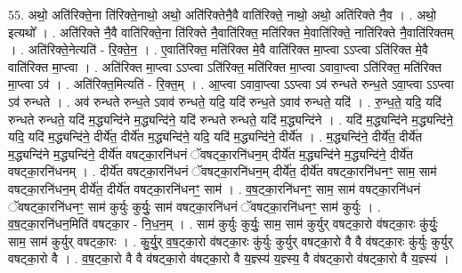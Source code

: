 \documentclass[17pt]{extarticle}
\begin{document}
55. अथो॒ अति॑रिक्ते॒ना ति॑रिक्ते॒नाथो॒ अथो॒ अति॑रिक्तेनै॒वै वाति॑रिक्ते॒ नाथो॒ अथो॒ अति॑रिक्ते नै॒व । . अथो॒ इत्यथो᳚ । . अति॑रिक्ते नै॒वै वाति॑रिक्ते॒ना ति॑रिक्ते नै॒वाति॑रिक्त॒ मति॑रिक्त मे॒वाति॑रिक्ते॒ नाति॑रिक्ते नै॒वाति॑रिक्तम् । . अति॑रिक्ते॒नेत्यति॑ - रि॒क्ते॒न॒ । . ए॒वाति॑रिक्त॒ मति॑रिक्त मे॒वै वाति॑रिक्त मा॒प्त्वा ऽऽप्त्वा ऽति॑रिक्त मे॒वै वाति॑रिक्त मा॒प्त्वा । . अति॑रिक्त मा॒प्त्वा ऽऽप्त्वा ऽति॑रिक्त॒ मति॑रिक्त मा॒प्त्वा ऽवावा॒प्त्वा ऽति॑रिक्त॒ मति॑रिक्त मा॒प्त्वा ऽव॑ । . अति॑रिक्त॒मित्यति॑ - रि॒क्त॒म् । . आ॒प्त्वा ऽवावा॒प्त्वा ऽऽप्त्वा ऽव॑ रुन्धते रुन्ध॒ते ऽवा॒प्त्वा ऽऽप्त्वा ऽव॑ रुन्धते । . अव॑ रुन्धते रुन्ध॒ते ऽवाव॑ रुन्धते॒ यदि॒ यदि॑ रुन्ध॒ते ऽवाव॑ रुन्धते॒ यदि॑ । . रु॒न्ध॒ते॒ यदि॒ यदि॑ रुन्धते रुन्धते॒ यदि॑ म॒द्ध्यन्दि॑ने म॒द्ध्यन्दि॑ने॒ यदि॑ रुन्धते रुन्धते॒ यदि॑ म॒द्ध्यन्दि॑ने । . यदि॑ म॒द्ध्यन्दि॑ने म॒द्ध्यन्दि॑ने॒ यदि॒ यदि॑ म॒द्ध्यन्दि॑ने॒ दीर्ये॑त॒ दीर्ये॑त म॒द्ध्यन्दि॑ने॒ यदि॒ यदि॑ म॒द्ध्यन्दि॑ने॒ दीर्ये॑त । . म॒द्ध्यन्दि॑ने॒ दीर्ये॑त॒ दीर्ये॑त म॒द्ध्यन्दि॑ने म॒द्ध्यन्दि॑ने॒ दीर्ये॑त वषट्का॒रनि॑धनं ॅवषट्का॒रनि॑धन॒म् दीर्ये॑त म॒द्ध्यन्दि॑ने म॒द्ध्यन्दि॑ने॒ दीर्ये॑त वषट्का॒रनि॑धनम् । . दीर्ये॑त वषट्का॒रनि॑धनं ॅवषट्का॒रनि॑धन॒म् दीर्ये॑त॒ दीर्ये॑त वषट्का॒रनि॑धनꣳ॒॒ साम॒ साम॑ वषट्का॒रनि॑धन॒म् दीर्ये॑त॒ दीर्ये॑त वषट्का॒रनि॑धनꣳ॒॒ साम॑ । . व॒ष॒ट्का॒रनि॑धनꣳ॒॒ साम॒ साम॑ वषट्का॒रनि॑धनं ॅवषट्का॒रनि॑धनꣳ॒॒ साम॑ कुर्युः कुर्युः॒ साम॑ वषट्का॒रनि॑धनं ॅवषट्का॒रनि॑धनꣳ॒॒ साम॑ कुर्युः । . व॒ष॒ट्का॒रनि॑धन॒मिति॑ वषट्का॒र - नि॒ध॒न॒म् । . साम॑ कुर्युः कुर्युः॒ साम॒ साम॑ कुर्युर् वषट्का॒रो व॑षट्का॒रः कु॑र्युः॒ साम॒ साम॑ कुर्युर् वषट्का॒रः । . कु॒र्यु॒र् व॒ष॒ट्का॒रो व॑षट्का॒रः कु॑र्युः कुर्युर् वषट्का॒रो वै वै व॑षट्का॒रः कु॑र्युः कुर्युर् वषट्का॒रो वै । . व॒ष॒ट्का॒रो वै वै व॑षट्का॒रो व॑षट्का॒रो वै य॒ज्ञ्स्य॑ य॒ज्ञ्स्य॒ वै व॑षट्का॒रो व॑षट्का॒रो वै य॒ज्ञ्स्य॑ । \newline
\end{document}
